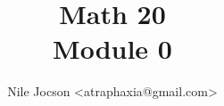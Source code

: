 \documentclass{article}
\title{
	Math 20 \\
	Module 0
}
\author{Nile Jocson \textless{}atraphaxia@gmail.com\textgreater{}}
\begin{document}
	\maketitle{}
		\pagebreak{}

	\tableofcontents{}
		\pagebreak{}

	
	
	
	
	
\end{document}
